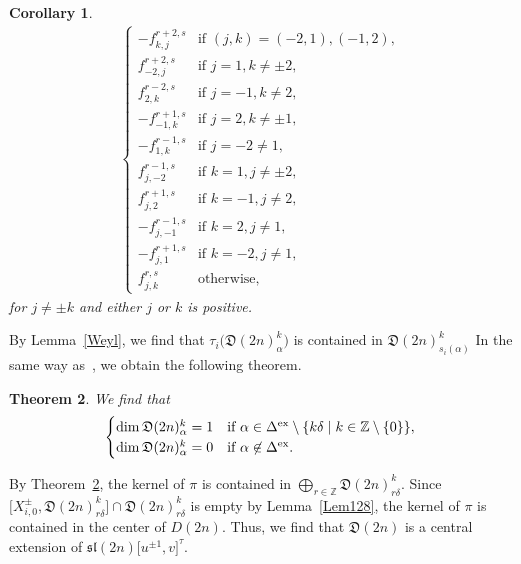 \documentclass[pdftex]{sigma}
\numberwithin{equation}{section}
\newtheorem{Theorem}{Theorem}[section]
\newtheorem{Corollary}[Theorem]{Corollary}
\theoremstyle{definition}
\begin{document}
\begin{Corollary}
{\begin{align*}
\begin{cases}
-f_{k,j}^{r+2,s}&\text{if }(j,k)=(-2,1),(-1,2),\\
f_{-2,j}^{r+2,s}&\text{if }j=1,k\neq\pm 2,\\
f_{2,k}^{r-2,s}&\text{if }j=-1,k\neq 2,\\
-f_{-1,k}^{r+1,s}&\text{if }j=2,k\neq \pm 1,\\
-f_{1,k}^{r-1,s}&\text{if }j=-2\neq 1,\\
f_{j,-2}^{r-1,s}&\text{if }k=1,j\neq\pm 2,\\
f_{j,2}^{r+1,s}&\text{if }k=-1,j\neq 2,\\
-f_{j,-1}^{r-1,s}&\text{if }k=2,j\neq 1,\\
-f_{j,1}^{r+1,s}&\text{if }k=-2,j\neq 1,\\
f_{j,k}^{r,s}&\text{otherwise},
\end{cases}
\end{align*}
for $j\neq \pm k$ and either $j$ or $k$ is positive.}
\end{Corollary}

By Lemma~\ref{Weyl}, we find that $\tau_i\bigl(\mathfrak{D}(2n)_\alpha^k\bigr)$ is contained in $\mathfrak{D}(2n)_{s_i(\alpha)}^k$
In the same way as~\cite[Proposition~3.2]{MRY}, we obtain the following theorem.
\begin{Theorem}\label{Thm128}
We find that
\[\begin{cases}
\dim \mathfrak{D}(2n)_\alpha^k=1&\text{if }\alpha\in\Delta^{{\rm ex}}\setminus\{k\delta\mid k\in\mathbb{Z}\setminus\{0\}\},\\
\dim \mathfrak{D}(2n)_\alpha^k=0&\text{if }\alpha\not\in\Delta^{{\rm ex}}.
\end{cases}
\]
\end{Theorem}
By Theorem~\ref{Thm128}, the kernel of $\pi$ is contained in $\bigoplus_{r\in\mathbb{Z}} \mathfrak{D}(2n)_{r\delta}^k$. Since $\bigl[X^\pm_{i,0},\mathfrak{D}(2n)_{r\delta}^k\bigr]\cap \mathfrak{D}(2n)_{r\delta}^k$ is empty by Lemma~\ref{Lem128}, the kernel of $\pi$ is contained in the center of $D(2n)$.
Thus, we find that $\mathfrak{D}(2n)$ is a central extension of $\mathfrak{sl}(2n)\bigl[u^{\pm1},v\bigr]^\tau$.
\end{document}
